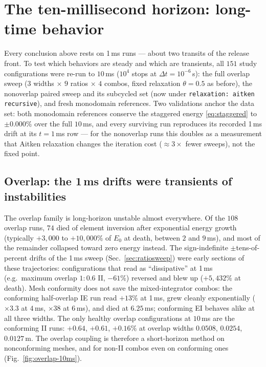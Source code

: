 \documentclass[11pt]{article}
\newcommand{\code}[1]{\texttt{#1}}
\begin{document}
\section{The ten-millisecond horizon: long-time behavior}
\label{sec:tenms}

Every conclusion above rests on 1\,ms runs --- about two transits of the
release front. To test which behaviors are steady and which are transients,
all $151$ study configurations were re-run to $10$\,ms ($10^4$ stops at
$\Delta t = 10^{-6}$\,s): the full overlap sweep ($3$ widths $\times$ $9$
ratios $\times$ $4$ combos, fixed relaxation $\theta = 0.5$ as before), the
nonoverlap paired sweep and its subcycled set (now under
\code{relaxation: aitken recursive}), and fresh monodomain references. Two
validations anchor the data set: both monodomain references conserve the
staggered energy \eqref{eq:staggered} to $\pm 0.000\%$ over the full
$10$\,ms, and every surviving run reproduces its recorded 1\,ms drift at
its $t = 1$\,ms row --- for the nonoverlap runs this doubles as a
measurement that Aitken relaxation changes the iteration cost
($\approx 3\times$ fewer sweeps), not the fixed point.

\subsection*{Overlap: the 1\,ms drifts were transients of instabilities}

The overlap family is long-horizon unstable almost everywhere. Of the
$108$ overlap runs, $74$ died of element inversion after exponential
energy growth (typically $+3{,}000$ to $+10{,}000\%$ of $E_0$ at death,
between $2$ and $9$\,ms), and most of the remainder collapsed toward zero
energy instead. The sign-indefinite $\pm$tens-of-percent drifts of the
1\,ms sweep (Sec.~\ref{sec:ratiosweep}) were early sections of these
trajectories: configurations that read as ``dissipative'' at 1\,ms (e.g.\
maximum overlap $1{:}0.6$ II, $-61\%$) reversed and blew up ($+5{,}432\%$
at death). Mesh conformity does not save the mixed-integrator combos: the
conforming half-overlap IE run read $+13\%$ at 1\,ms, grew cleanly
exponentially ($\times 3.3$ at $4$\,ms, $\times 38$ at $6$\,ms), and died
at $6.25$\,ms; conforming EI behaves alike at all three widths. The only
healthy overlap configurations at $10$\,ms are the conforming II runs:
$+0.64$, $+0.61$, $+0.16\%$ at overlap widths $0.0508$, $0.0254$,
$0.0127$\,m. The overlap coupling is therefore a short-horizon method on
nonconforming meshes, and for non-II combos even on conforming ones
(Fig.~\ref{fig:overlap-10ms}).
\end{document}
